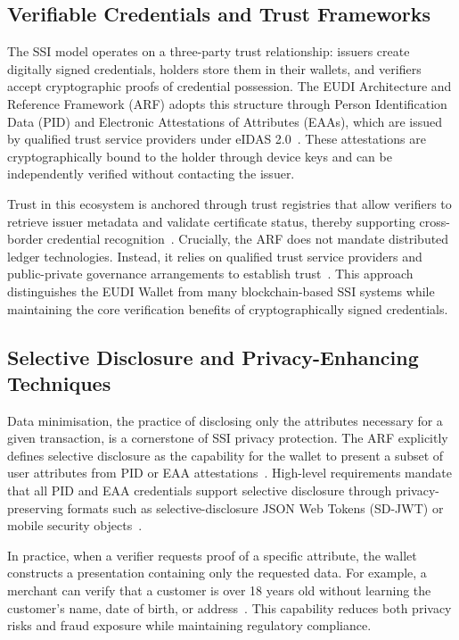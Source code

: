 \documentclass[sigconf,balance,nonacm,authordraft]{acmart}
\begin{document}
\subsection{Verifiable Credentials and Trust Frameworks}

The SSI model operates on a three-party trust relationship: issuers create digitally signed credentials, holders store them in their wallets, and verifiers accept cryptographic proofs of credential possession. The EUDI Architecture and Reference Framework (ARF) adopts this structure through Person Identification Data (PID) and Electronic Attestations of Attributes (EAAs), which are issued by qualified trust service providers under eIDAS 2.0~\cite{PortoThesis}. These attestations are cryptographically bound to the holder through device keys and can be independently verified without contacting the issuer.

Trust in this ecosystem is anchored through trust registries that allow verifiers to retrieve issuer metadata and validate certificate status, thereby supporting cross-border credential recognition~\cite{PortoThesis,Finextra_SSI_Components}. Crucially, the ARF does not mandate distributed ledger technologies. Instead, it relies on qualified trust service providers and public-private governance arrangements to establish trust~\cite{Finextra_SSI_Differences}. This approach distinguishes the EUDI Wallet from many blockchain-based SSI systems while maintaining the core verification benefits of cryptographically signed credentials.

\subsection{Selective Disclosure and Privacy-Enhancing Techniques}

Data minimisation, the practice of disclosing only the attributes necessary for a given transaction, is a cornerstone of SSI privacy protection. The ARF explicitly defines selective disclosure as the capability for the wallet to present a subset of user attributes from PID or EAA attestations~\cite{ARF_SelectDisclosureDefinition}. High-level requirements mandate that all PID and EAA credentials support selective disclosure through privacy-preserving formats such as selective-disclosure JSON Web Tokens (SD-JWT) or mobile security objects~\cite{ARF_AttestationSelectiveDisclosure}.

In practice, when a verifier requests proof of a specific attribute, the wallet constructs a presentation containing only the requested data. For example, a merchant can verify that a customer is over 18 years old without learning the customer's name, date of birth, or address~\cite{ISC2_SelectDisclosureExample,DocuSign_SelectDisclosure}. This capability reduces both privacy risks and fraud exposure while maintaining regulatory compliance.
\end{document}
